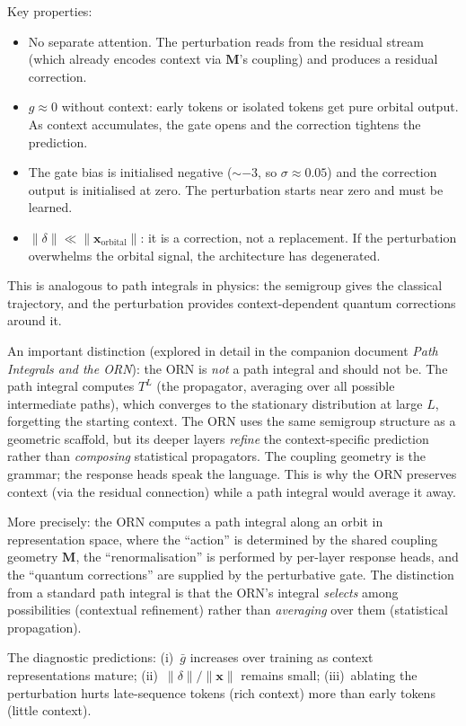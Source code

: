 \documentclass[11pt, a4paper]{article}
\newcommand{\M}{\mathbf{M}}
\newcommand{\x}{\mathbf{x}}
\theoremstyle{remark}
\begin{document}
Key properties:
\begin{itemize}[nosep]
    \item No separate attention. The perturbation reads from the residual stream (which already encodes context via $\M$'s coupling) and produces a residual correction.
    \item $g \approx 0$ without context: early tokens or isolated tokens get pure orbital output. As context accumulates, the gate opens and the correction tightens the prediction.
    \item The gate bias is initialised negative (${\sim}{-}3$, so $\sigma \approx 0.05$) and the correction output is initialised at zero. The perturbation starts near zero and must be learned.
    \item $\|\delta\| \ll \|\x_{\text{orbital}}\|$: it is a correction, not a replacement. If the perturbation overwhelms the orbital signal, the architecture has degenerated.
\end{itemize}

\noindent
This is analogous to path integrals in physics: the semigroup gives the classical trajectory, and the perturbation provides context-dependent quantum corrections around it.

An important distinction (explored in detail in the companion document \textit{Path Integrals and the ORN}): the ORN is \emph{not} a path integral and should not be.
The path integral computes $T^L$ (the propagator, averaging over all possible intermediate paths), which converges to the stationary distribution at large $L$, forgetting the starting context.
The ORN uses the same semigroup structure as a geometric scaffold, but its deeper layers \emph{refine} the context-specific prediction rather than \emph{composing} statistical propagators.
The coupling geometry is the grammar; the response heads speak the language.
This is why the ORN preserves context (via the residual connection) while a path integral would average it away.

More precisely: the ORN computes a path integral along an orbit in representation space, where the ``action'' is determined by the shared coupling geometry $\M$, the ``renormalisation'' is performed by per-layer response heads, and the ``quantum corrections'' are supplied by the perturbative gate.
The distinction from a standard path integral is that the ORN's integral \emph{selects} among possibilities (contextual refinement) rather than \emph{averaging} over them (statistical propagation).

The diagnostic predictions: (i)~$\bar{g}$ increases over training as context representations mature; (ii)~$\|\delta\|/\|\x\|$ remains small; (iii)~ablating the perturbation hurts late-sequence tokens (rich context) more than early tokens (little context).
\end{document}
